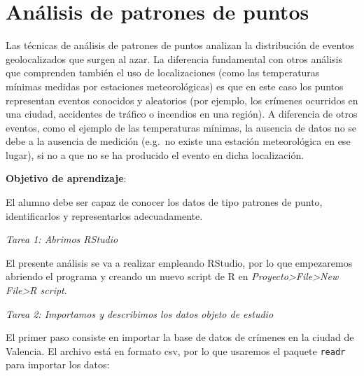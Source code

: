 \documentclass[
]{book}
\begin{document}
\hypertarget{anuxe1lisis-de-patrones-de-puntos}{%
\section{Análisis de patrones de puntos}\label{anuxe1lisis-de-patrones-de-puntos}}

Las técnicas de análisis de patrones de puntos analizan la distribución de
eventos geolocalizados que surgen al azar. La diferencia fundamental con otros
análisis que comprenden también el uso de localizaciones (como las temperaturas
mínimas medidas por estaciones meteorológicas) es que en este caso los puntos
representan eventos conocidos y aleatorios (por ejemplo, los crímenes ocurridos
en una ciudad, accidentes de tráfico o incendios en una región). A diferencia de
otros eventos, como el ejemplo de las temperaturas mínimas, la ausencia de datos
no se debe a la ausencia de medición (e.g.~no existe una estación meteorológica
en ese lugar), si no a que no se ha producido el evento en dicha localización.

\textbf{Objetivo de aprendizaje}:

El alumno debe ser capaz de conocer los datos de tipo patrones de punto,
identificarlos y representarlos adecuadamente.

\emph{Tarea 1: Abrimos RStudio}

El presente análisis se va a realizar empleando RStudio, por lo que empezaremos
abriendo el programa y creando un nuevo script de R en \emph{Proyecto\textgreater File\textgreater New File\textgreater R
script}.

\emph{Tarea 2: Importamos y describimos los datos objeto de estudio}

El primer paso consiste en importar la base de datos de crímenes en la ciudad de
Valencia. El archivo está en formato csv, por lo que usaremos el paquete \texttt{readr}
para importar los datos:
\end{document}

